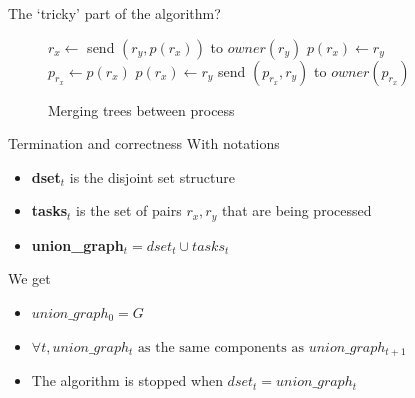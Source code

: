 \documentclass{beamer}
\begin{document}
  \begin{frame}{The `tricky' part of the algorithm?}
    \begin{figure}
      \begin{algorithm}[H]
        \caption{Merging trees between process}%
        \label{alg:rem_distributed}
        \begin{algorithmic}[1]
            \State $r_x \gets$ 
            \State
              \State send $(r_y, p(r_x))$ to $owner(r_y)$
                \State $p(r_x) \gets r_y$
              \Else
                \State $p_{r_x} \gets p(r_x)$
                \State $p(r_x) \gets r_y$
                \State send $(p_{r_x}, r_y)$ to $owner(p_{r_x})$
              \EndIf
            \EndIf
          \EndFunction
       \end{algorithmic}
      \end{algorithm}
    \end{figure}
  \end{frame}

  \begin{frame}{Termination and correctness}
    With notations
    \begin{itemize}
      \item \textbf{dset}$_t$ is the disjoint set structure
      \item \textbf{tasks}$_t$ is the set of pairs $r_x, r_y$ that are being processed
      \item \textbf{union\_graph}$_t = dset_t \cup tasks_t$ 
    \end{itemize}
    We get
    \begin{itemize}
      \item $union\_graph_0 = G$
      \item $\forall t, union\_graph_t \text{ as the same components as } union\_graph_{t+1}$
      \item The algorithm is stopped when $dset_t = union\_graph_t$
    \end{itemize}
  \end{frame}

%    
\end{document}
